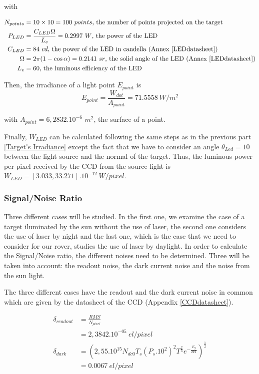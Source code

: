 with

\begin{align*}
N_{points} & = 10\times 10 = 100\ points\mbox{, the number of points projected on the  target}\\
P_{LED} & = \frac{C_{LED}\Omega}{L_e} = 0.2997\ W\mbox{, the power of the LED}\\
C_{LED} & = 84\ cd\mbox{, the power of the LED in candella (Annex \ref{LEDdatasheet})}\\
\Omega & = 2\pi (1-\cos \alpha) = 0.2141\ sr\mbox{, the solid angle of the LED (Annex \ref{LEDdatasheet})}\\
L_e & = 60\mbox{, the luminous efficiency of the LED}
\end{align*}

Then, the irradiance of a light point $E_{point}$ is
\begin{equation}
E_{point} = \frac{W_{dot}}{A_{point}} = 71.5558\ W/m^2
\end{equation}

with $A_{point} = 6,2832.10^{-6}$ $m^2$, the surface of a point.

Finally, $W_{LED}$ can be calculated following the same steps as in the previous part \ref{Target's Irradiance} except the fact that we have to consider an angle $\theta_{Led} = 10$\textdegree $ $ between the light source and the normal of the target. Thus, the luminous power per pixel received by the CCD from the source light is $W_{LED} = [3.033, 33.271].10^{-12}\ W/pixel$.






\subsubsection{Signal/Noise Ratio}
Three different cases will be studied. In the first one, we examine the case of a target iluminated by the sun without the use of laser, the second one considers the use of laser by night and the last one, which is the case that we need to consider for our rover, studies the use of laser by daylight.
In order to calculate the Signal/Noise ratio, the different noises need to be determined. Three will be taken into account: the readout noise, the dark current noise and the noise from the sun light. 

The three different cases have the readout and the dark current noise in common which are given by the datasheet of the CCD (Appendix \ref{CCDdatasheet}).

\begin{align}
\delta_{readout} & = \frac{RMS}{N_{pixel}} \\
& = 2,3842.10^{-05} \ el/pixel \label{eq:readout} \\
\delta_{dark} & = \left(2,55.10^{15}N_{dc0}T_s(P_s.10^2)^2T^{\frac{2}{3}}e^{-\frac{E_g}{2kT}}\right)^{\frac{1}{2}} \\
& = 0.0067 \ el/pixel \label{eq:darkcurrent}
\end{align}

